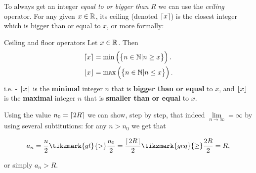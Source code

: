 To always get an integer \textit{equal to or bigger than} $R$ we can use the \emph{ceiling} operator. For any given $x\in\mathbb{R}^{}$, its ceiling (denoted $\lceil x \rceil$) is the closest integer which is bigger than or equal to $x$, or more formally:

\begin{definition}{Ceiling and floor operators}{}
	Let $x\in\mathbb{R}^{}$. Then
	\begin{align}
		\lceil x \rceil &= \min\left(\left\{ n\in\mathbb{N} | n\geq x\right\}\right).\\
		\lfloor x \rfloor &= \max\left(\left\{ n\in\mathbb{N} | n\leq x\right\}\right).
		\label{eq:ceiling}
	\end{align}
	i.e. - $\lceil x \rceil$ is the \textbf{minimal} integer $n$ that is \textbf{bigger than or equal} to $x$, and $\lfloor x \rfloor$ is the \textbf{maximal} integer $n$ that is \textbf{smaller than or equal} to $x$.
\end{definition}

Using the value $n_{0}=\lceil 2R \rceil$ we can show, step by step, that indeed $\lim\limits_{n\to\infty}=\infty$ by using several subtitutions: for any $n>n_{0}$ we get that

\vspace{1em}
\[
	a_{n} = \frac{n}{2} \tikzmark{gt}{>} \frac{n_{0}}{2} = \frac{\ceil{2R}}{2} \tikzmark{geq}{\geq}\frac{2R}{2} = R,
\]

\vspace{2em}
or simply $a_{n}>R$.

